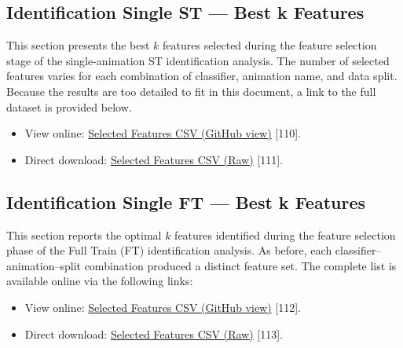\documentclass{article}
\begin{document}
\subsection{Identification Single ST — Best k Features}

This section presents the best $k$ features selected during the feature selection stage of the single-animation ST identification analysis.
The number of selected features varies for each combination of classifier, animation name, and data split. 
Because the results are too detailed to fit in this document, a link to the full dataset is provided below.

\begin{itemize}
    \item View online: 
    \href{https://github.com/DavideMascheroni99/movingText/blob/main/Programs/Machine_Learning/Machine_Learning_results/Identification_single_results/selected_features_st.csv}
    {Selected Features CSV (GitHub view)} [110].
    \item Direct download: 
    \href{https://github.com/DavideMascheroni99/movingText/raw/main/Programs/Machine_Learning/Machine_Learning_results/Identification_single_results/selected_features_st.csv}
    {Selected Features CSV (Raw)} [111].
\end{itemize}
\FloatBarrier

\subsection{Identification Single FT — Best k Features}
\label{subsec:topk_ft}

This section reports the optimal $k$ features identified during the feature selection phase of the Full Train (FT) identification analysis.
As before, each classifier–animation–split combination produced a distinct feature set.
The complete list is available online via the following links:

\begin{itemize}
    \item View online: 
    \href{https://github.com/DavideMascheroni99/movingText/blob/main/Programs/Machine_Learning/Machine_Learning_results/Identification_single_results/selected_features_ft.csv}
    {Selected Features CSV (GitHub view)} [112].
    \item Direct download: 
    \href{https://github.com/DavideMascheroni99/movingText/raw/main/Programs/Machine_Learning/Machine_Learning_results/Identification_single_results/selected_features_ft.csv}
    {Selected Features CSV (Raw)} [113].
\end{itemize}
\FloatBarrier
\end{document}
